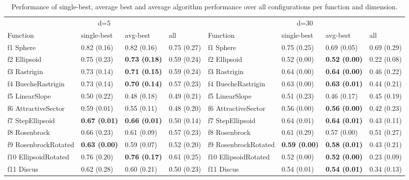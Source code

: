 \begin{table}
\caption{Performance of single-best, average best and average algorithm performance over all configurations per function and dimension.}
\begin{tabular}{llllllll}
\toprule
\multicolumn{4}{c}{d=5} & \multicolumn{4}{c}{d=30} \\
Function & single-best & avg-best & all & Function & single-best & avg-best & all \\
\midrule
f1 Sphere & 0.82 (0.16) & 0.82 (0.16) & 0.75 (0.27) & f1 Sphere & 0.75 (0.25) & 0.69 (0.05) & 0.69 (0.29) \\
f2 Ellipsoid & 0.75 (0.23) & \textbf{0.73 (0.18)} & 0.59 (0.24) & f2 Ellipsoid & 0.52 (0.00) & \textbf{0.52 (0.00)} & 0.22 (0.08) \\
f3 Rastrigin & 0.73 (0.14) & \textbf{0.71 (0.15)} & 0.59 (0.24) & f3 Rastrigin & 0.64 (0.00) & \textbf{0.64 (0.00)} & 0.46 (0.22) \\
f4 BuecheRastrigin & 0.73 (0.14) & \textbf{0.70 (0.14)} & 0.57 (0.23) & f4 BuecheRastrigin & 0.63 (0.00) & \textbf{0.63 (0.01)} & 0.44 (0.21) \\
f5 LinearSlope & 0.50 (0.22) & 0.48 (0.18) & 0.49 (0.21) & f5 LinearSlope & 0.51 (0.23) & 0.46 (0.17) & 0.45 (0.19) \\
f6 AttractiveSector & 0.59 (0.01) & 0.55 (0.11) & 0.48 (0.20) & f6 AttractiveSector & 0.56 (0.00) & \textbf{0.56 (0.00)} & 0.42 (0.23) \\
f7 StepEllipsoid & \textbf{0.67 (0.01)} & \textbf{0.66 (0.01)} & 0.50 (0.14) & f7 StepEllipsoid & 0.64 (0.01) & \textbf{0.64 (0.01)} & 0.43 (0.11) \\
f8 Rosenbrock & 0.66 (0.23) & 0.61 (0.09) & 0.57 (0.23) & f8 Rosenbrock & 0.61 (0.29) & 0.57 (0.00) & 0.51 (0.27) \\
f9 RosenbrockRotated & \textbf{0.63 (0.00)} & 0.59 (0.07) & 0.52 (0.20) & f9 RosenbrockRotated & \textbf{0.59 (0.00)} & \textbf{0.58 (0.01)} & 0.43 (0.21) \\
f10 EllipsoidRotated & 0.76 (0.20) & \textbf{0.76 (0.17)} & 0.61 (0.25) & f10 EllipsoidRotated & 0.52 (0.00) & \textbf{0.52 (0.00)} & 0.23 (0.09) \\
f11 Discus & 0.62 (0.28) & 0.60 (0.21) & 0.50 (0.23) & f11 Discus & 0.54 (0.01) & \textbf{0.54 (0.01)} & 0.34 (0.13) \\

\end{tabular}
\end{table}
